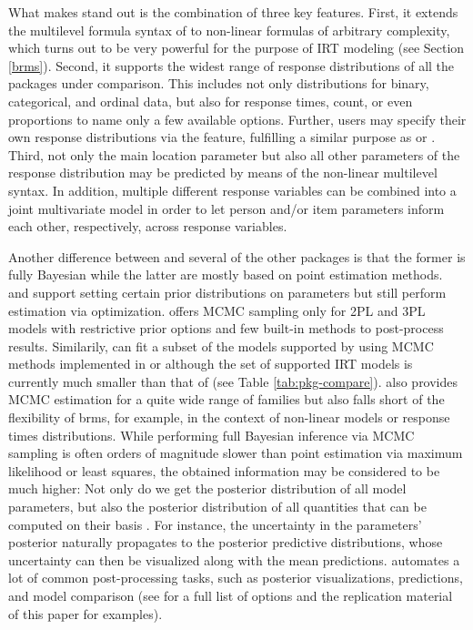\documentclass[
]{jss}
\begin{document}
What makes  stand out is the combination of three key
features. First, it extends the multilevel formula syntax of 
to non-linear formulas of arbitrary complexity, which turns out to be
very powerful for the purpose of IRT modeling (see Section \ref{brms}).
Second, it supports the widest range of response distributions of all
the packages under comparison. This includes not only distributions for
binary, categorical, and ordinal data, but also for response times,
count, or even proportions to name only a few available options.
Further, users may specify their own response distributions via the
 feature, fulfilling a similar purpose as
 or . Third, not only the main
location parameter but also all other parameters of the response
distribution may be predicted by means of the non-linear multilevel
syntax. In addition, multiple different response variables can be
combined into a joint multivariate model in order to let person and/or
item parameters inform each other, respectively, across response
variables.

Another difference between  and several of the other packages
is that the former is fully Bayesian while the latter are mostly based
on point estimation methods.  and  support setting
certain prior distributions on parameters but still perform estimation
via optimization.  offers MCMC sampling only for 2PL and 3PL
models with restrictive prior options and few built-in methods to
post-process results. Similarily,  can fit a subset of the
models supported by  using MCMC methods implemented in
 \citep{jags} or  \citep{carpenter2017}
although the set of supported IRT models is currently much smaller than
that of  (see Table \ref{tab:pkg-compare}). 
also provides MCMC estimation for a quite wide range of families but
also falls short of the flexibility of brms, for example, in the context
of non-linear models or response times distributions. While performing
full Bayesian inference via MCMC sampling is often orders of magnitude
slower than point estimation via maximum likelihood or least squares,
the obtained information may be considered to be much higher: Not only
do we get the posterior distribution of all model parameters, but also
the posterior distribution of all quantities that can be computed on
their basis \citep{gelman2013}. For instance, the uncertainty in the
parameters' posterior naturally propagates to the posterior predictive
distributions, whose uncertainty can then be visualized along with the
mean predictions.  automates a lot of common post-processing
tasks, such as posterior visualizations, predictions, and model
comparison (see  for a full list of options and the replication material of
this paper for examples).
\end{document}
